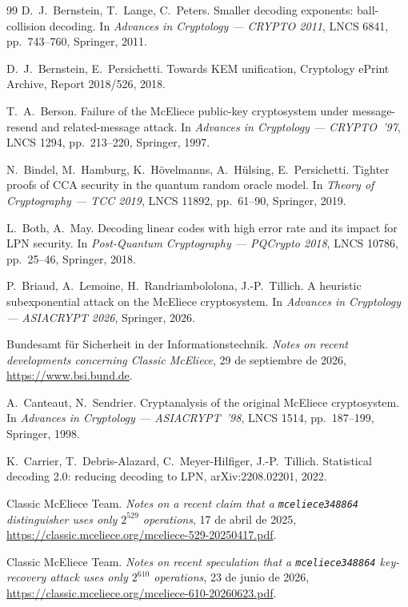 \begin{thebibliography}{99}
D.~J.~Bernstein, T.~Lange, C.~Peters. Smaller decoding exponents:
ball-collision decoding. In \emph{Advances in Cryptology ---
CRYPTO 2011}, LNCS 6841, pp.~743--760, Springer, 2011.

D.~J.~Bernstein, E.~Persichetti. Towards KEM unification, Cryptology
ePrint Archive, Report 2018/526, 2018.

T.~A.~Berson. Failure of the McEliece public-key cryptosystem under
message-resend and related-message attack. In \emph{Advances in
Cryptology --- CRYPTO~'97}, LNCS 1294, pp.~213--220, Springer, 1997.

N.~Bindel, M.~Hamburg, K.~H\"ovelmanns, A.~H\"ulsing, E.~Persichetti.
Tighter proofs of CCA security in the quantum random oracle model.
In \emph{Theory of Cryptography --- TCC 2019}, LNCS 11892,
pp.~61--90, Springer, 2019.

L.~Both, A.~May. Decoding linear codes with high error rate and its
impact for LPN security. In \emph{Post-Quantum Cryptography ---
PQCrypto 2018}, LNCS 10786, pp.~25--46, Springer, 2018.

P.~Briaud, A.~Lemoine, H.~Randriambololona, J.-P.~Tillich. A
heuristic subexponential attack on the McEliece cryptosystem. In
\emph{Advances in Cryptology --- ASIACRYPT 2026}, Springer, 2026.

Bundesamt f\"ur Sicherheit in der Informationstechnik. \emph{Notes on
recent developments concerning Classic McEliece}, 29 de septiembre
de 2026, \url{https://www.bsi.bund.de}.

A.~Canteaut, N.~Sendrier. Cryptanalysis of the original McEliece
cryptosystem. In \emph{Advances in Cryptology --- ASIACRYPT~'98},
LNCS 1514, pp.~187--199, Springer, 1998.

K.~Carrier, T.~Debris-Alazard, C.~Meyer-Hilfiger, J.-P.~Tillich.
Statistical decoding 2.0: reducing decoding to LPN,
arXiv:2208.02201, 2022.

Classic McEliece Team. \emph{Notes on a recent claim that a
\texttt{mceliece348864} distinguisher uses only $2^{529}$
operations}, 17 de abril de 2025,
\url{https://classic.mceliece.org/mceliece-529-20250417.pdf}.

Classic McEliece Team. \emph{Notes on recent speculation that a
\texttt{mceliece348864} key-recovery attack uses only $2^{610}$
operations}, 23 de junio de 2026,
\url{https://classic.mceliece.org/mceliece-610-20260623.pdf}.


\end{thebibliography}
